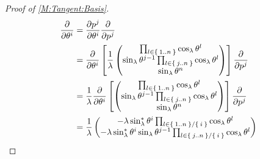\documentclass[../methodology.tex]{subfiles}
\begin{document}
\begin{proof}[Proof of \cref{M:Tangent:Basis}]
  \begin{align*}
    \frac{\partial}{\partial\tensor{\theta}{^i}}
     & =\frac{\partial\tensor{p}{^j}}{\partial\tensor{\theta}{^i}}\frac{\partial}{\partial\tensor{p}{^j}}                                                                        \\
     & =\frac{\partial}{\partial\tensor{\theta}{^i}}
    \left[
      \frac{1}{\lambda}
      \begin{pmatrix}
        \prod_{l\in\Set{1..n}}{\cos_\lambda{\tensor{\theta}{^l}}}                                      \\
        \sin_\lambda{\tensor{\theta}{^{j-1}}}\prod_{l\in\Set{j..n}}{\cos_\lambda{\tensor{\theta}{^l}}} \\
        \sin_\lambda{{\tensor{\theta}{^n}}}                                                            \\
      \end{pmatrix}
    \right]\frac{\partial}{\partial\tensor{p}{^j}}                                                                                                                               \\
     & =
    \frac{1}{\lambda}
    \frac{\partial}{\partial\tensor{\theta}{^i}}
    \left[
      \begin{pmatrix}
        \prod_{l\in\Set{1..n}}{\cos_\lambda{\tensor{\theta}{^l}}}                                      \\
        \sin_\lambda{\tensor{\theta}{^{j-1}}}\prod_{l\in\Set{j..n}}{\cos_\lambda{\tensor{\theta}{^l}}} \\
        \sin_\lambda{{\tensor{\theta}{^n}}}                                                            \\
      \end{pmatrix}
    \right]\frac{\partial}{\partial\tensor{p}{^j}}                                                                                                                               \\
     & =
    \frac{1}{\lambda}
    \begin{pmatrix}
      -\lambda\sin_\lambda^\ast{\tensor{\theta}{^i}}\prod_{l\in\Set{1..n}/\Set{i}}{\cos_\lambda{\tensor{\theta}{^l}}}                                      \\
      -\lambda\sin_\lambda^\ast{\tensor{\theta}{^i}}\sin_\lambda{\tensor{\theta}{^{j-1}}}\prod_{l\in\Set{j..n}/\Set{i}}{\cos_\lambda{\tensor{\theta}{^l}}} \\

\end{pmatrix}
\end{align*}
\end{proof}
\end{document}
